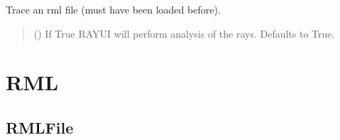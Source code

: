 \documentclass[letterpaper,10pt,english]{sphinxmanual}
\begin{document}
\begin{fulllineitems}
\begin{fulllineitems}
\begin{quote}
\begin{description}
\end{description}\end{quote}

\end{fulllineitems}


\begin{fulllineitems}
\label{\detokenize{API:raypyng.runner.RayUIAPI.trace}}
\pysigstartsignatures
{}
\pysigstopsignatures
\sphinxAtStartPar
Trace an rml file (must have been loaded before).
\begin{quote}\begin{description}
\sphinxAtStartPar
{} (\sphinxstyleliteralemphasis{\sphinxupquote{, }}) \textendash{} If True RAY\sphinxhyphen{}UI will perform analysis of the rays.
Defaults to True.

\end{description}\end{quote}

\end{fulllineitems}


\end{fulllineitems}



\section{RML}
\label{\detokenize{API:rml}}

\subsection{RMLFile}
\label{\detokenize{API:rmlfile}}
\end{document}
